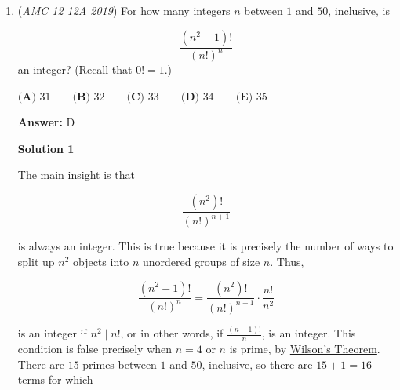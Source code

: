 \begin{enumerate}
 Now expressing $\log_7a_{n-1}$ in a similar expression as $\log_7a_n$,

 
 \[\log_7(a_n)=(\log_7n)(\log_{n-1}7)(\log_7n-1)(\log_{n-2}7)(\log_7a_{n-2})\]
 \[\log_7(a_n)=(\log_7n)(\log_{n-1}7)(\log_7n-1)(\log_{n-2}7)(\log_7n-2)(\log_{n-3}7)...(\log_74)(\log_37)(\log_7a_3)\]

 Because of the fact that $(\log_ab)(\log_ba)=1$, we can cancel out the terms to get

 
 \[\log_7(a_n)=(\log_7n)(\log_37)(\log_7a_3)\]
 \[\log_7(a_n)=(\log_7n)(\log_37)(\log_7(3^{\frac{1}{\log_72}}))\]
 \[\log_7(a_n)=(\log_7n)(\log_37)(\log_27)(\log_73)\]
 \[\log_7(a_n)=(\log_27)(\log_7n)\]

 Using the Chain Rule for Logarithm, $(\log_ab)(\log_bc)=\log_ac$, yields

 
 \[\log_7(a_n)=(\log_2n)\]Finally, substituting in $n=2019$, we have
 \[\log_7(a_{2019})=(\log_22019)\]
 \[\log_7(a_{2019})\approx11\boxed{\mathrm{(D)}}\]

 \href{https://artofproblemsolving.com/videos/amc/2019amc12a/495}{https://artofproblemsolving.com/videos/amc/2019amc12a/495}

 


	\item (\textit{AMC 12 12A 2019}) For how many integers $n$ between $1$ and $50$, inclusive, is

 \[\frac{(n^2-1)!}{(n!)^n}\]
an integer? (Recall that $0! = 1$.)


 $\textbf{(A) } 31 \qquad \textbf{(B) } 32 \qquad \textbf{(C) } 33 \qquad \textbf{(D) } 34 \qquad \textbf{(E) } 35$

 \textbf{Answer: }D



\textbf{Solution 1}

The main insight is that 

 
 \[\frac{(n^2)!}{(n!)^{n+1}}\] 

 is always an integer. This is true because it is precisely the number of ways to split up $n^2$ objects into $n$ unordered groups of size $n$. Thus,

 
 \[\frac{(n^2-1)!}{(n!)^n}=\frac{(n^2)!}{(n!)^{n+1}}\cdot\frac{n!}{n^2}\]

 is an integer if $n^2 \mid n!$, or in other words, if $\frac{(n-1)!}{n}$, is an integer. This condition is false precisely when $n=4$ or $n$ is prime, by \href{https://artofproblemsolving.com/wiki/index.php?title=Wilson\%27s\_Theorem}{Wilson's Theorem}. There are $15$ primes between $1$ and $50$, inclusive, so there are $15 + 1 = 16$ terms for which


\end{enumerate}

